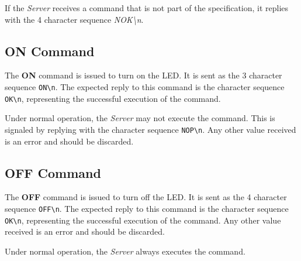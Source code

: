 \documentclass[conference, a4paper]{IEEEtran}
\begin{document}
If the \textit{Server} receives a command that is not part of the specification, it replies with the 4 character sequence \textit{NOK\textbackslash n}.

\subsection{ON Command}

The \textbf{ON} command is issued to turn on the LED. It is sent as the 3 character sequence \texttt{ON\textbackslash n}. The expected reply to this command is the character sequence \texttt{OK\textbackslash n}, representing the successful execution of the command.

Under normal operation, the \textit{Server} may not execute the command. This is signaled by replying with the character sequence \texttt{NOP\textbackslash n}. Any other value received is an error and should be discarded.

\subsection{OFF Command}

The \textbf{OFF} command is issued to turn off the LED. It is sent as the 4 character sequence \texttt{OFF\textbackslash n}. The expected reply to this command is the character sequence \texttt{OK\textbackslash n}, representing the successful execution of the command. Any other value received is an error and should be discarded.

Under normal operation, the \textit{Server} always executes the command.

\end{document}
